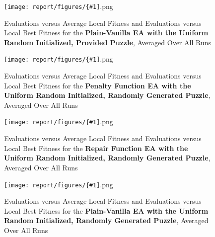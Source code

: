 \documentclass[11pt]{article}
\newcommand{\fitnessplotcaption}[1]{\caption{Evaluations versus Average Local Fitness and Evaluations versus 
    Local Best Fitness for the \textbf{{#1}}, Averaged Over All Runs}}
\newcommand{\addgraphic}[1]{\centerline{\texttt{[image: report/figures/\{\#1]}.png}}}
\begin{document}
\begin{figure}
    \addgraphic{website_puzzle_uniform_random_vanilla_graph}
    \fitnessplotcaption{Plain-Vanilla EA with the Uniform Random Initialized, Provided Puzzle}
    \label{fig:website_puzzle_uniform_random_vanilla_graph}
\end{figure}

\begin{figure}
    \addgraphic{random_gen_uniform_random_graph}
    \fitnessplotcaption{Penalty Function EA with the Uniform Random Initialized, Randomly Generated Puzzle}
    \label{fig:random_gen_uniform_random_graph}
\end{figure}

\begin{figure}
    \addgraphic{random_gen_uniform_random_bonus_graph}
    \fitnessplotcaption{Repair Function EA with the Uniform Random Initialized, Randomly Generated Puzzle}
    \label{fig:random_gen_uniform_random_bonus_graph}
\end{figure}

\begin{figure}
    \addgraphic{random_gen_uniform_random_vanilla_graph}
    \fitnessplotcaption{Plain-Vanilla EA with the Uniform Random Initialized, Randomly Generated Puzzle}
    \label{fig:random_gen_uniform_random_vanilla_graph}
\end{figure}
\end{document}
